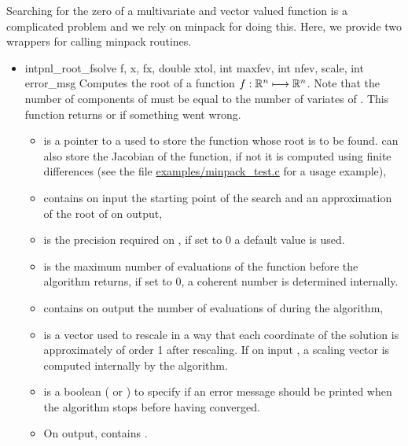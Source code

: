 Searching for the zero of a multivariate and vector valued function is a
complicated problem and we rely on minpack for doing this. Here, we provide
two wrappers for calling minpack routines.
\begin{itemize}
  \item \describefun
    {int}{pnl_root_fsolve}{ \ptr f,
     \ptr x,  \ptr fx, double xtol,
    int maxfev, int \ptr nfev,  \ptr scale, int
    error_msg}
    \sshortdescribe Computes the root of a function $f:{\mathbb R}^n \longmapsto
    {\mathbb R}^n$. Note that the number of components of  must be equal to the
    number of variates of . This function returns  or
     if something went wrong. 
    \parameters
    \begin{itemize}
      \item {} is a pointer to a  used to
        store the function whose root is to be found.  can also
        store the Jacobian of the function, if not it is computed using
        finite differences (see the file \url{examples/minpack_test.c} for
        a usage example),
      \item  {} contains on input the starting point of the search and
        an approximation of the root of  on output,
      \item {} is the precision required on , if set to 0 a
        default value is used.
      \item {} is the maximum number of evaluations of the function
         before the algorithm returns, if set to 0, a coherent
        number is determined internally.
      \item {} contains on output the number of evaluations of
         during the algorithm,
      \item {} is a vector used to rescale  in a way that
        each coordinate of the solution is approximately of order 1 after
        rescaling. If on input , a scaling vector is
        computed internally by the algorithm.
      \item {} is a boolean
        ( or ) to specify if an error message should be
        printed when the algorithm stops before having converged.
      \item On output,  contains .
    \end{itemize}


\end{itemize}
